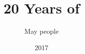 \documentclass[11pt,letterpaper]{book}
\title{20 Years of \GNOME}
\author{May people}
\date{2017}
\begin{document}
\maketitle
\tableofcontents



\printglossaries
\printindex
\end{document}
